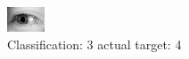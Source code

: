 \begin{figure}[h!]
\begin{center}
\includegraphics[width=0.60\columnwidth]{figures/ID3220_class_3_target_4.png}
\end{center}
\caption{ Classification: 3 actual target: 4}
\label{fig:ID3220_class_3_target_4}
\end{figure}
